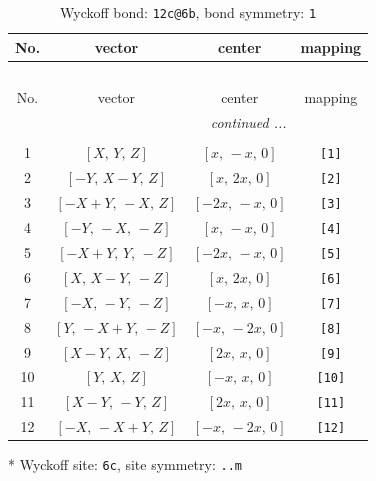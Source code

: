 \documentclass[fleqn,8pt]{jsarticle}
\begin{document}
\begin{longtable}{cccc}
\caption{Wyckoff bond: {\tt 12c@6b}, bond symmetry: {\tt 1}}
 \\
 \hline \hline
No. & vector & center & mapping \\ \hline \endfirsthead

\multicolumn{3}{l}{\tablename\ \thetable{}} \\
 \hline \hline
No. & vector & center & mapping \\ \hline \endhead

 \hline \hline
\multicolumn{3}{r}{\footnotesize\it continued ...} \\ \endfoot

 \hline \hline
\multicolumn{3}{r}{} \\ \endlastfoot

1 & $\left[ X,\, Y,\, Z \right]$ & $\left[ x,\, - x,\, 0 \right]$ & {\tt [1]} \\ \hline
2 & $\left[ - Y,\, X - Y,\, Z \right]$ & $\left[ x,\, 2 x,\, 0 \right]$ & {\tt [2]} \\ \hline
3 & $\left[ - X + Y,\, - X,\, Z \right]$ & $\left[ - 2 x,\, - x,\, 0 \right]$ & {\tt [3]} \\ \hline
4 & $\left[ - Y,\, - X,\, - Z \right]$ & $\left[ x,\, - x,\, 0 \right]$ & {\tt [4]} \\ \hline
5 & $\left[ - X + Y,\, Y,\, - Z \right]$ & $\left[ - 2 x,\, - x,\, 0 \right]$ & {\tt [5]} \\ \hline
6 & $\left[ X,\, X - Y,\, - Z \right]$ & $\left[ x,\, 2 x,\, 0 \right]$ & {\tt [6]} \\ \hline
7 & $\left[ - X,\, - Y,\, - Z \right]$ & $\left[ - x,\, x,\, 0 \right]$ & {\tt [7]} \\ \hline
8 & $\left[ Y,\, - X + Y,\, - Z \right]$ & $\left[ - x,\, - 2 x,\, 0 \right]$ & {\tt [8]} \\ \hline
9 & $\left[ X - Y,\, X,\, - Z \right]$ & $\left[ 2 x,\, x,\, 0 \right]$ & {\tt [9]} \\ \hline
10 & $\left[ Y,\, X,\, Z \right]$ & $\left[ - x,\, x,\, 0 \right]$ & {\tt [10]} \\ \hline
11 & $\left[ X - Y,\, - Y,\, Z \right]$ & $\left[ 2 x,\, x,\, 0 \right]$ & {\tt [11]} \\ \hline
12 & $\left[ - X,\, - X + Y,\, Z \right]$ & $\left[ - x,\, - 2 x,\, 0 \right]$ & {\tt [12]} \\
\end{longtable}
* Wyckoff site: {\tt 6c}, site symmetry: {\tt ..m}
\renewcommand{\arraystretch}{1.2}
\end{document}

